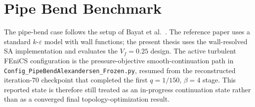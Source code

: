 \FloatBarrier

\section{Pipe Bend Benchmark}
\label{sec:app_B_config_alexandersen_pipebend}

The pipe-bend case follows the setup of Bayat et al.~\cite{Bayat2026}. The reference paper uses a standard $k$-$\varepsilon$ model with wall functions; the present thesis uses the wall-resolved SA implementation and evaluates the $V_f=0.25$ design. The active turbulent FEniCS configuration is the pressure-objective smooth-continuation path in \texttt{Config\_PipeBendAlexandersen\_Frozen.py}, resumed from the reconstructed iteration-$70$ checkpoint that completed the first $q=1/150$, $\beta=4$ stage. This reported state is therefore still treated as an in-progress continuation state rather than as a converged final topology-optimization result.

